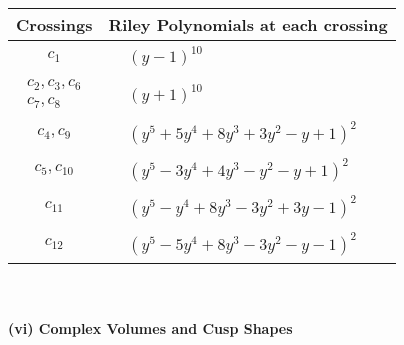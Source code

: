 \documentclass[1p]{elsarticle_modified}
\theoremstyle{definition}
\begin{document}
\begin{tabular}{m{50pt}|m{274pt}}
Crossings & \hspace{64pt}Riley Polynomials at each crossing \\
\hline $$\begin{aligned}c_{1}\end{aligned}$$&$\begin{aligned}
&(y-1)^{10}
\end{aligned}$\\
\hline $$\begin{aligned}c_{2},c_{3},c_{6}\\c_{7},c_{8}\end{aligned}$$&$\begin{aligned}
&(y+1)^{10}
\end{aligned}$\\
\hline $$\begin{aligned}c_{4},c_{9}\end{aligned}$$&$\begin{aligned}
&(y^5+5 y^4+8 y^3+3 y^2- y+1)^2
\end{aligned}$\\
\hline $$\begin{aligned}c_{5},c_{10}\end{aligned}$$&$\begin{aligned}
&(y^5-3 y^4+4 y^3- y^2- y+1)^2
\end{aligned}$\\
\hline $$\begin{aligned}c_{11}\end{aligned}$$&$\begin{aligned}
&(y^5- y^4+8 y^3-3 y^2+3 y-1)^2
\end{aligned}$\\
\hline $$\begin{aligned}c_{12}\end{aligned}$$&$\begin{aligned}
&(y^5-5 y^4+8 y^3-3 y^2- y-1)^2
\end{aligned}$\\
\hline
\end{tabular}\\~\\
\newpage\flushleft \textbf{(vi) Complex Volumes and Cusp Shapes}
\end{document}
